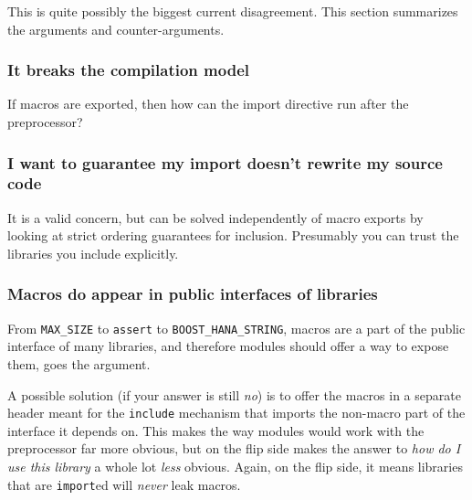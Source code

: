 \documentclass[reqno]{article}
\begin{document}
\begin{multicols}{2}
This is quite possibly the biggest current disagreement. This section summarizes
the arguments and counter-arguments.


\subsubsection{It breaks the compilation model}

If macros are exported, then how can the import directive run after the
preprocessor?

\subsubsection{I want to guarantee my import doesn't rewrite my source code}

It is a valid concern, but can be solved independently of macro exports by
looking at strict ordering guarantees for inclusion. Presumably you can trust
the libraries you include explicitly.

\subsubsection{Macros do appear in public interfaces of libraries}

From \texttt{MAX\_SIZE} to \texttt{assert} to \texttt{BOOST\_HANA\_STRING},
macros are a part of the public interface of many libraries, and therefore
modules should offer a way to expose them, goes the argument.

A possible solution (if your answer is still \emph{no}) is to offer the macros
in a separate header meant for the \texttt{include} mechanism that imports the
non-macro part of the interface it depends on. This makes the way modules would
work with the preprocessor far more obvious, but on the flip side makes the
answer to \emph{how do I use this library} a whole lot \emph{less} obvious.
Again, on the flip side, it means libraries that are \texttt{import}ed will
\emph{never} leak macros.


\end{multicols}

% 
\end{document}
